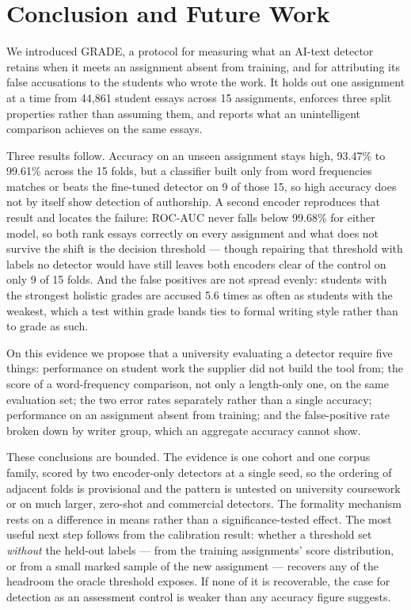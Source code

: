 \documentclass[11pt,a4paper]{article}
\begin{document}
\section{Conclusion and Future Work}

We introduced GRADE, a protocol for measuring what an AI-text detector
retains when it meets an assignment absent from training, and for
attributing its false accusations to the students who wrote the work. It
holds out one assignment at a time from 44{,}861 student essays across 15
assignments, enforces three split properties rather than assuming them, and
reports what an unintelligent comparison achieves on the same essays.

Three results follow. Accuracy on an unseen assignment stays high, 93.47\%
to 99.61\% across the 15 folds, but a classifier built only from word
frequencies matches or beats the fine-tuned detector on 9 of those 15, so
high accuracy does not by itself show detection of authorship. A second
encoder reproduces that result and locates the failure: ROC-AUC never falls
below 99.68\% for either model, so both rank essays correctly on every
assignment and what does not survive the shift is the decision threshold
--- though repairing that threshold with labels no detector would have
still leaves both encoders clear of the control on only 9 of 15 folds. And
the false positives are not spread evenly: students with the strongest
holistic grades are accused 5.6 times as often as students with the
weakest, which a test within grade bands ties to formal writing style
rather than to grade as such.

On this evidence we propose that a university evaluating a detector require
five things: performance on student work the supplier did not build the
tool from; the score of a word-frequency comparison, not only a length-only
one, on the same evaluation set; the two error rates separately rather than
a single accuracy; performance on an assignment absent from training; and
the false-positive rate broken down by writer group, which an aggregate
accuracy cannot show.

These conclusions are bounded. The evidence is one cohort and one corpus
family, scored by two encoder-only detectors at a single seed, so the
ordering of adjacent folds is provisional and the pattern is untested on
university coursework or on much larger, zero-shot and commercial
detectors. The formality mechanism rests on a difference in means rather
than a significance-tested effect. The most useful next step follows from
the calibration result: whether a threshold set \emph{without} the held-out
labels --- from the training assignments' score distribution, or from a
small marked sample of the new assignment --- recovers any of the headroom
the oracle threshold exposes. If none of it is recoverable, the case for
detection as an assessment control is weaker than any accuracy figure
suggests.
\end{document}

